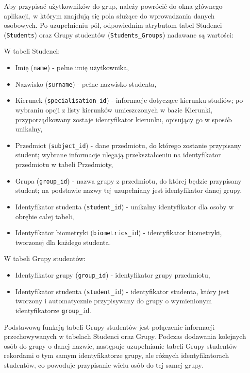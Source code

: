 Aby przypisać użytkowników do grup, należy powrócić do okna głównego aplikacji, w którym znajdują się pola służące do wprowadzania danych osobowych. Po uzupełnieniu pól, odpowiednim atrybutom tabel Studenci (\verb!Students!) oraz Grupy studentów (\verb!Students_Groups!) nadawane są wartości:

W tabeli Studenci:
\begin{itemize}
\item Imię (\verb!name!) - pełne imię użytkownika,
\item Nazwisko (\verb!surname!) - pełne nazwisko studenta,
\item Kierunek (\verb!specialisation_id!) - informacje dotyczące kierunku studiów; po wybraniu opcji z listy kierunków umieszczonych w bazie Kierunki, przyporządkowany zostaje identyfikator kierunku, opisujący go w sposób unikalny,
\item Przedmiot (\verb!subject_id!) - dane przedmiotu, do którego zostanie przypisany student; wybrane informacje ulegają przekształceniu na identyfikator przedmiotu w tabeli Przedmioty,
\item Grupa (\verb!group_id!) - nazwa grupy z przedmiotu, do której będzie przypisany student; na podstawie nazwy tej uzupełniany jest identyfikator danej grupy,
\item Identyfikator studenta (\verb!student_id!) - unikalny identyfikator dla osoby w obrębie całej tabeli,
\item Identyfikator biometryki (\verb!biometrics_id!) - identyfikator biometryki, tworzonej dla każdego studenta.
\end{itemize}

W tabeli Grupy studentów:
\begin{itemize}
\item Identyfikator grupy (\verb!group_id!) - identyfikator grupy przedmiotu,
\item Identyfikator studenta (\verb!student_id!) - identyfikator studenta, który jest tworzony i automatycznie przypisywany do grupy o wymienionym identyfikatorze \verb!group_id!.
\end{itemize}

Podstawową funkcją tabeli Grupy studentów jest połączenie informacji przechowywanych w tabelach Studenci oraz Grupy. Podczas dodawania kolejnych osób do grupy o danej nazwie, następuje uzupełnianie tabeli Grupy studentów rekordami o tym samym identyfikatorze grupy, ale różnych identyfikatorach studentów, co powoduje przypisanie wielu osób do tej samej grupy. 

